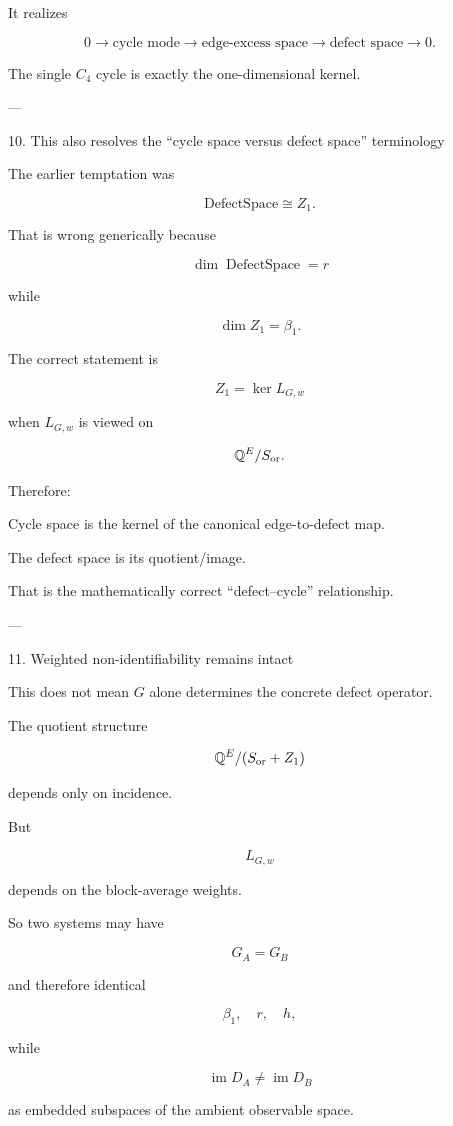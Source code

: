 It realizes

\[
\boxed{
0\to\text{cycle mode}
\to\text{edge-excess space}
\to\text{defect space}
\to0.
}
\]

The single \(C_4\) cycle is exactly the one-dimensional kernel.


---

10. This also resolves the “cycle space versus defect space” terminology

The earlier temptation was

\[
\text{DefectSpace}\cong Z_1.
\]

That is wrong generically because

\[
\dim\operatorname{DefectSpace}=r
\]

while

\[
\dim Z_1=\beta_1.
\]

The correct statement is

\[
\boxed{
Z_1
=
\ker L_{G,w}
}
\]

when \(L_{G,w}\) is viewed on

\[
\mathbb Q^E/S_{\rm or}.
\]

Therefore:

Cycle space is the kernel of the canonical edge-to-defect map.

The defect space is its quotient/image.

That is the mathematically correct “defect–cycle” relationship.


---

11. Weighted non-identifiability remains intact

This does not mean \(G\) alone determines the concrete defect operator.

The quotient structure

\[
\mathbb Q^E/(S_{\rm or}+Z_1)
\]

depends only on incidence.

But

\[
L_{G,w}
\]

depends on the block-average weights.

So two systems may have

\[
G_A=G_B
\]

and therefore identical

\[
\beta_1,\quad r,\quad h,
\]

while

\[
\operatorname{im}D_A
\neq
\operatorname{im}D_B
\]

as embedded subspaces of the ambient observable space.

